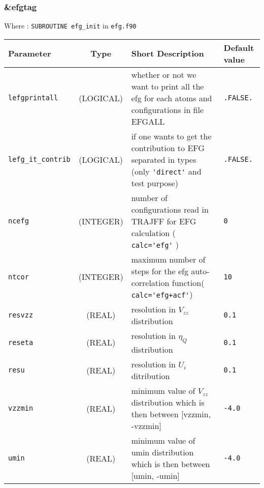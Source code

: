 \documentclass[a4paper]{article}
\begin{document}
\subsubsection{\&efgtag}

Where : \verb?SUBROUTINE efg_init? in \verb?efg.f90?
\newline

\begin{longtable}{l|c|m{8cm}|m{2cm}}
\hline
\hline
Parameter        &  Type              &          Short Description                                                          & Default value \\
\hline
\hline
\rule[-0.75cm]{0cm}{1.5cm}
\verb?lefgprintall?    
                 & (LOGICAL)          &  whether or not we want to print all the efg for each atoms and 
                                               configurations in file EFGALL                                                & \verb?.FALSE.? \\
\hline
\rule[-0.75cm]{0cm}{1.5cm}
\verb?lefg_it_contrib? 
                 & (LOGICAL)          & if one wants to get the contribution to EFG separated in types 
                                              (only \verb?'direct'? and test purpose)                                       & \verb?.FALSE.? \\
\hline
\rule[-0.75cm]{0cm}{1.5cm}
\verb?ncefg?     & (INTEGER)          & number of configurations read in TRAJFF for EFG calculation ( \verb?calc='efg'? )   & \verb?0? \\
\hline
\rule[-0.75cm]{0cm}{1.5cm}
\verb?ntcor?     & (INTEGER)          & maximum number of steps for the efg auto-correlation function( \verb?calc='efg+acf'?)
                                                                                                                            & \verb?10? \\
\hline
\rule[-0.75cm]{0cm}{1.5cm}
\verb?resvzz?    & (REAL)             & resolution in $V_{zz}$ distribution                                                 & \verb?0.1? \\
\hline
\rule[-0.75cm]{0cm}{1.5cm}
\verb?reseta?    & (REAL)             & resolution in $\eta_Q$ distribution                                                 & \verb?0.1? \\
\hline
\rule[-0.75cm]{0cm}{1.5cm}
\verb?resu?      & (REAL)             & resolution in $U_i$ ditribution                                                     & \verb?0.1? \\
\hline
\rule[-0.75cm]{0cm}{1.5cm}
\verb?vzzmin?    & (REAL)             & minimum value of $V_{zz}$ distribution which is then between [vzzmin, -vzzmin]      & \verb?-4.0? \\ 
\hline
\rule[-0.75cm]{0cm}{1.5cm}
\verb?umin?      & (REAL)             & minimum value of umin distribution which is then between [umin, -umin]              & \verb?-4.0? \\
\hline
\hline
\end{longtable}
\end{document}
